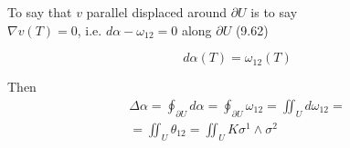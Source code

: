 To say that $v$ parallel displaced around $\partial U$ is to say \\
\quad $\nabla v(T) =0$, i.e. $d\alpha - \omega_{12} =0$ along $\partial U$  \quad (9.62)

\[
d \alpha(T) = \omega_{12}(T)
\]

Then 
\[
\begin{gathered}
        \Delta \alpha = \oint_{\partial U} d\alpha = \oint_{\partial U} \omega_{12} = \iint_U d\omega_{12} = \\
        = \iint_U \theta_{12} = \iint_U K \sigma^1 \wedge \sigma^2 
\end{gathered}
\]
